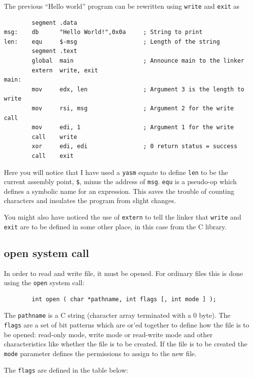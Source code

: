 \documentclass[11pt,b5paper]{book}
\begin{document}
The previous ``Hello world'' program can be rewritten using {\tt write} and {\tt exit} as

\begin{verbatim}
        segment .data
msg:    db      "Hello World!",0x0a     ; String to print
len:    equ     $-msg                   ; Length of the string
        segment .text
        global  main                    ; Announce main to the linker
        extern  write, exit
main:
        mov     edx, len                ; Argument 3 is the length to write
        mov     rsi, msg                ; Argument 2 for the write call
        mov     edi, 1                  ; Argument 1 for the write
        call    write
        xor     edi, edi                ; 0 return status = success
        call    exit
\end{verbatim}

Here you will notice that I have used a {\tt yasm} equate to define {\tt len} to be the current assembly point, {\tt \$}, minus the address of {\tt msg}.  
{\tt equ} is a pseudo-op which defines a symbolic name for an expression.
This saves the trouble of counting characters and insulates the program from slight changes.

You might also have noticed the use of {\tt extern} to tell the linker that {\tt write} and {\tt exit}
are to be defined in some other place, in this case from the C library.


\subsection{open system call}

In order to read and write  file, it must be opened.  
For ordinary files this is done using the {\tt open} system call:
\begin{verbatim}
        int open ( char *pathname, int flags [, int mode ] );
\end{verbatim}

The {\tt pathname} is a C string (character array terminated with a 0 byte).
The {\tt flags} are a set of bit patterns which are or'ed together to
define how the file is to be opened: read-only mode, write mode or read-write mode and
other characteristics like whether the file is to be created.
If the file is to be created the {\tt mode} parameter defines the permissions to assign
to the new file.

The {\tt flags} are defined in the table below:
\end{document}

